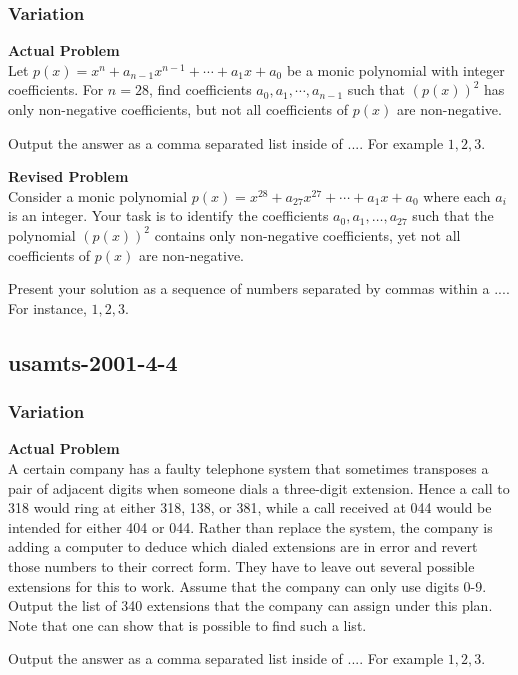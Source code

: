 \subsubsection{Variation}
\textbf{Actual Problem}\\
Let $p(x) = x^n + a_{n-1}x^{n-1} + \cdots + a_1x + a_0$ be a monic polynomial with integer coefficients.
For $n = 28$, find coefficients $a_0, a_1, \cdots, a_{n-1}$ such that $(p(x))^2$ has only non-negative coefficients, but not all coefficients of $p(x)$ are non-negative.

Output the answer as a comma separated list inside of $\boxed{...}$. For example $\boxed{1, 2, 3}$.

\textbf{Revised Problem}\\
Consider a monic polynomial \( p(x) = x^{28} + a_{27}x^{27} + \cdots + a_1x + a_0 \) where each \( a_i \) is an integer. Your task is to identify the coefficients \( a_0, a_1, \ldots, a_{27} \) such that the polynomial \( (p(x))^2 \) contains only non-negative coefficients, yet not all coefficients of \( p(x) \) are non-negative.

Present your solution as a sequence of numbers separated by commas within a \(\boxed{...}\). For instance, \(\boxed{1, 2, 3}\).

\subsection{usamts-2001-4-4}
\subsubsection{Variation}
\textbf{Actual Problem}\\
A certain company has a faulty telephone system that sometimes transposes a pair of
adjacent digits when someone dials a three-digit extension. Hence a call to 318 would ring
at either 318, 138, or 381, while a call received at 044 would be intended for either
404 or 044. Rather than replace the system, the company is adding a computer to deduce
which dialed extensions are in error and revert those numbers to their correct form. They have
to leave out several possible extensions for this to work.
Assume that the company can only use digits 0-9. Output the list of 340 extensions that the company can assign under this plan.
Note that one can show that is possible to find such a list.


Output the answer as a comma separated list inside of $\boxed{...}$. For example $\boxed{1, 2, 3}$.

